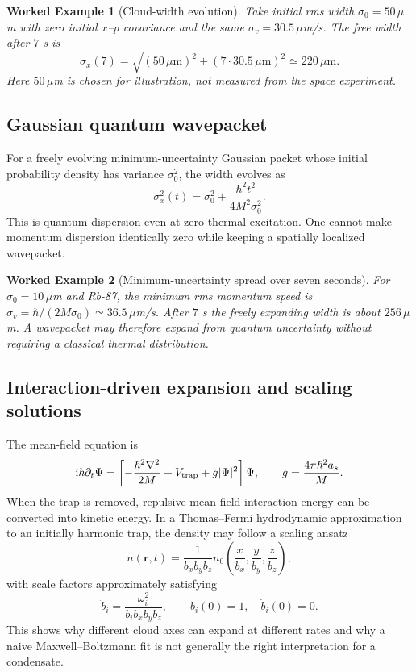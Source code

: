 \documentclass[11pt,a4paper]{article}
\newtheorem{example}{Worked Example}
\newcommand{\ii}{\mathrm i}
\newcommand{\hc}{\hbar}
\begin{document}
\begin{example}[Cloud-width evolution]
Take initial rms width $\sigma_0=50\,\mu$m with zero initial $x$--$p$ covariance and the same $\sigma_v=30.5\,\mu$m/s. The free width after $7$ s is
\[\sigma_x(7)=\sqrt{(50\,\mu\mathrm m)^2+(7\cdot30.5\,\mu\mathrm m)^2}\simeq220\,\mu\mathrm m.\]
Here $50\,\mu$m is chosen for illustration, not measured from the space experiment.
\end{example}

\subsection{Gaussian quantum wavepacket}
For a freely evolving minimum-uncertainty Gaussian packet whose initial probability density has variance $\sigma_0^2$, the width evolves as
\begin{equation}\sigma_x^2(t)=\sigma_0^2+\frac{\hc^2t^2}{4M^2\sigma_0^2}.\end{equation}
This is quantum dispersion even at zero thermal excitation. One cannot make momentum dispersion identically zero while keeping a spatially localized wavepacket.

\begin{example}[Minimum-uncertainty spread over seven seconds]
For $\sigma_0=10\,\mu$m and Rb-87, the minimum rms momentum speed is $\sigma_v=\hc/(2M\sigma_0)\simeq36.5\,\mu$m/s. After $7$ s the freely expanding width is about $256\,\mu$m. A wavepacket may therefore expand from quantum uncertainty without requiring a classical thermal distribution.
\end{example}

\subsection{Interaction-driven expansion and scaling solutions}
The mean-field equation is
\begin{equation} \ii\hc\partial_t\Psi=\left[-\frac{\hc^2\nabla^2}{2M}+V_{\rm trap}+g|\Psi|^2\right]\Psi,\qquad g=\frac{4\pi\hc^2a_s}{M}.\end{equation}
When the trap is removed, repulsive mean-field interaction energy can be converted into kinetic energy. In a Thomas--Fermi hydrodynamic approximation to an initially harmonic trap, the density may follow a scaling ansatz
\begin{equation}n(\mathbf r,t)=\frac{1}{b_xb_yb_z}n_0\!\left(\frac{x}{b_x},\frac{y}{b_y},\frac{z}{b_z}\right),\end{equation}
with scale factors approximately satisfying
\begin{equation}\ddot b_i=\frac{\omega_i^2}{b_i b_xb_yb_z},\qquad b_i(0)=1,\quad\dot b_i(0)=0.\end{equation}
This shows why different cloud axes can expand at different rates and why a naive Maxwell--Boltzmann fit is not generally the right interpretation for a condensate.
\end{document}
